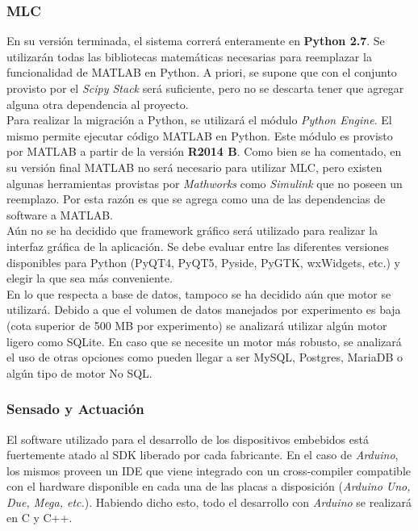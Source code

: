 \documentclass[a4paper,10pt]{article}
\begin{document}
    \subsubsection{MLC}
        En su versión terminada, el sistema correrá enteramente en \textbf{Python 2.7}. Se utilizarán todas las bibliotecas matemáticas
        necesarias para reemplazar la funcionalidad de MATLAB en Python. A priori, se supone que con el conjunto provisto por el
        \textit{Scipy Stack} será suficiente, pero no se descarta tener que agregar alguna otra dependencia al proyecto. \\
        \indent Para realizar la migración a Python, se utilizará el módulo \textit{Python Engine}. El mismo permite ejecutar código
        MATLAB en Python. Este módulo es provisto por MATLAB a partir de la versión \textbf{R2014 B}. Como bien se ha comentado, en su
        versión final MATLAB no será necesario para utilizar MLC, pero existen algunas herramientas provistas por \textit{Mathworks} como
        \textit{Simulink} que no poseen un reemplazo. Por esta razón es que se agrega como una de las dependencias de software a MATLAB. \\
        \indent Aún no se ha decidido que framework gráfico será utilizado para realizar la interfaz gráfica de la aplicación. Se debe
        evaluar entre las diferentes versiones disponibles para Python (PyQT4, PyQT5, Pyside, PyGTK, wxWidgets, etc.) y elegir la que sea
        más conveniente. \\
        \indent En lo que respecta a base de datos, tampoco se ha decidido aún que motor se utilizará. Debido a que el volumen de datos
        manejados por experimento es baja (cota superior de 500 MB por experimento) se analizará utilizar algún motor ligero como SQLite. 
        En caso que se necesite un motor más robusto, se analizará el uso de otras opciones como pueden llegar a ser MySQL, Postgres, 
        MariaDB o algún tipo de motor No SQL.

    \subsubsection{Sensado y Actuación}
        El software utilizado para el desarrollo de los dispositivos embebidos está fuertemente atado al SDK liberado por cada fabricante.
        En el caso de \textit{Arduino}, los mismos proveen un IDE que viene integrado con un cross-compiler compatible con el hardware
        disponible en cada una de las placas a disposición (\textit{Arduino Uno, Due, Mega, etc.}). Habiendo dicho esto, todo el desarrollo
        con \textit{Arduino} se realizará en C y C++.
\end{document}
